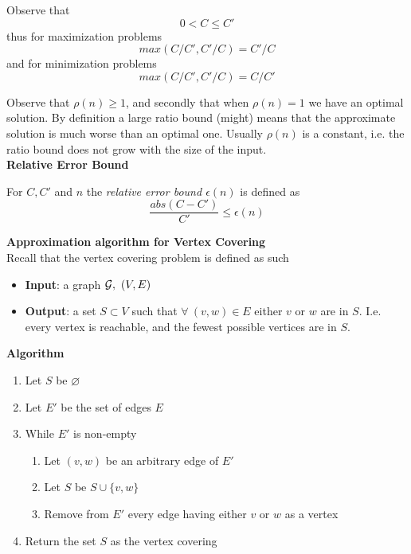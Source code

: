 Observe that
$$ 0 < C \leq C\prime $$
thus for maximization problems
$$ max(C/C\prime, C\prime/C) = C\prime/C $$
and for minimization problems
$$ max(C/C\prime, C\prime/C) = C/C\prime $$

Observe that $\rho(n) \geq 1$,
and secondly that when $\rho(n) = 1$ we have an optimal solution.
By definition a large  ratio bound (might) means that the approximate
solution is much worse than an optimal one.
Usually $\rho(n)$ is a constant,
i.e. the ratio bound does not grow with the size of the input.\\

\textbf{Relative Error Bound}
\begin{definition}
    For $C, C\prime$ and $n$  the \textit{relative error bound $\epsilon(n)$} is defined as
    $$\frac{abs(C - C\prime)}{C\prime} \leq \epsilon(n)$$
\end{definition}

\textbf{Approximation algorithm for Vertex Covering}\\
Recall that the vertex covering problem is defined as such
\begin{itemize}
    \item \textbf{Input}:
        a graph $\G,\ (V,E)$
    \item \textbf{Output}:
        a set $S \subset V$ such that $\forall\ (v,w) \in E$
        either $v$ or $w$ are in $S$.
        I.e. every vertex is reachable,
        and the fewest possible vertices are in $S$.
\end{itemize}

\textbf{Algorithm}
\begin{enumerate}
    \item Let $S$ be $\varnothing$
    \item Let $E\prime$ be the set of edges $E$
    \item While $E\prime$ is non-empty
        \begin{enumerate}
            \item
                Let $(v,w)$ be an arbitrary edge of $E\prime$
            \item
                Let $S$ be $S \cup \{v,w\}$
            \item
                Remove from $E\prime$ every edge having either $v$ or $w$ as a vertex
        \end{enumerate}
    \item Return the set $S$ as the vertex covering

\end{enumerate}

